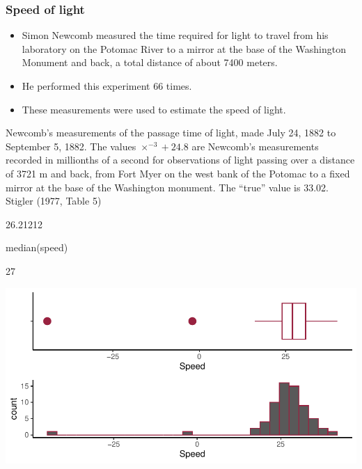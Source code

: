 \documentclass[a4paper]{article}\usepackage[]{graphicx}\usepackage[]{xcolor}
\makeatletter
\def\maxwidth{ %
  \ifdim\Gin@nat@width>\linewidth
    \linewidth
  \else
    \Gin@nat@width
  \fi
}
\makeatother
\begin{document}
\subsubsection{Speed of light}
\begin{itemize}
	\item Simon Newcomb measured the time required for light to travel from his laboratory on the Potomac River to a mirror at the base of the Washington Monument and back, a total distance of about 7400 meters.
	\item He performed this experiment 66 times.
	\item These measurements were used to estimate the speed of light.
\end{itemize}
Newcomb's measurements of the passage time of light, made July 24, 1882 to September 5, 1882. The values \( \times^{-3} + 24.8 \) are Newcomb's measurements recorded in millionths of a second for observations of light passing over a distance of 3721 m and back, from Fort Myer on the west bank of the Potomac to a fixed mirror at the base of the Washington monument. The ``true'' value is 33.02. Stigler (1977, Table 5)
\begin{Schunk}
\begin{Soutput}
[1] 26.21212
\end{Soutput}
\begin{Sinput}
median(speed)
\end{Sinput}
\begin{Soutput}
[1] 27
\end{Soutput}
\end{Schunk}
\begin{Schunk}


{\centering \includegraphics[width=\maxwidth]{figure/listings-unnamed-chunk-165-1} 

}

\end{Schunk}
\end{document}
